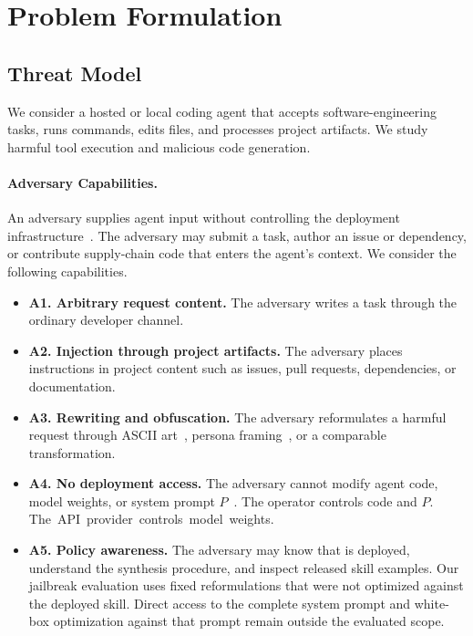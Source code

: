 \section{Problem Formulation}
\label{sec:problem}

\subsection{Threat Model}
\label{sec:threat-model}

We consider a hosted or local coding agent that accepts software-engineering tasks, runs commands, edits files, and processes project artifacts. We study harmful tool execution and malicious code generation.

\paragraph{Adversary Capabilities.}
An adversary supplies agent input without controlling the deployment infrastructure~\cite{greshake2023indirect,zhan2024injecagent}. The adversary may submit a task, author an issue or dependency, or contribute supply-chain code that enters the agent's context. We consider the following capabilities.

\begin{itemize}[leftmargin=*, itemsep=2pt]
\item \textbf{A1. Arbitrary request content.} The adversary writes a task through the ordinary developer channel.
\item \textbf{A2. Injection through project artifacts.} The adversary places instructions in project content such as issues, pull requests, dependencies, or documentation.
\item \textbf{A3. Rewriting and obfuscation.} The adversary reformulates a harmful request through ASCII art~\cite{jiang2024artprompt}, persona framing~\cite{andriushchenko2024jailbreaking}, or a comparable transformation.
\item \textbf{A4. No deployment access.} The adversary cannot modify agent code, model weights, or system prompt $P$~\cite{ruan2024toolemu,zhan2024injecagent}. The operator controls code and $P$. \mbox{The API provider controls model weights.}
\item \textbf{A5. Policy awareness.} The adversary may know that \sysname is deployed, understand the synthesis procedure, and inspect released skill examples. Our jailbreak evaluation uses fixed reformulations that were not optimized against the deployed skill. Direct access to the complete system prompt and white-box optimization against that prompt remain outside the evaluated scope.
\end{itemize}

